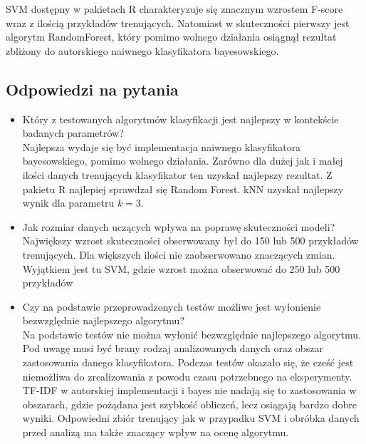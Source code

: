 \documentclass[a4paper, 10pt]{article}
\begin{document}
SVM dostępny w pakietach R charakteryzuje się znacznym wzrostem F-score wraz z ilością przykładów trenujących. Natomiast w skuteczności pierwszy jest algorytm RandomForest, który pomimo wolnego działania osiągnął
rezultat zbliżony do autorskiego  naiwnego klasyfikatora bayesowskiego. 


\subsection{Odpowiedzi na pytania}
\begin{itemize}
\item{Który z testowanych algorytmów klasyfikacji jest najlepszy w kontekście badanych parametrów? \\

Najlepsza wydaje się być implementacja naiwnego klasyfikatora bayesowskiego, pomimo wolnego działania. Zarówno dla dużej jak i małej ilości danych trenujących klasyfikator ten uzyskał najlepszy rezultat. 
Z pakietu R najlepiej sprawdzał się Random Forest. kNN uzyskał najlepszy wynik dla parametru $k=3$.}
\item{Jak rozmiar danych uczących wpływa na poprawę skuteczności modeli?\\

Największy wzrost skuteczności obserwowany był do 150 lub 500 przykładów trenujących. Dla większych ilości nie zaobserwowano znaczących zmian. Wyjątkiem jest tu SVM, gdzie wzrost można obserwować do 250 lub 500 przykładów

}
\item{Czy na podstawie przeprowadzonych testów możliwe jest wyłonienie bezwzględnie najlepszego algorytmu? \\

Na podstawie testów nie można wyłonić bezwzględnie najlepszego algorytmu. Pod uwagę musi być brany rodzaj analizowanych danych oraz obszar zastosowania danego klasyfikatora.
Podczas testów okazało się, że cześć jest niemożliwa do zrealizowania z powodu czasu potrzebnego na eksperymenty. TF-IDF w autorskiej implementacji i bayes nie nadają się to zastosowania w obszarach, gdzie pożądana jest szybkość obliczeń, lecz
osiągają bardzo dobre wyniki. Odpowiedni zbiór trenujący jak w przypadku SVM i obróbka danych przed analizą ma także znaczący wpływ na ocenę algorytmu.
}
\end{itemize}





\nocite{*}

\end{document}
